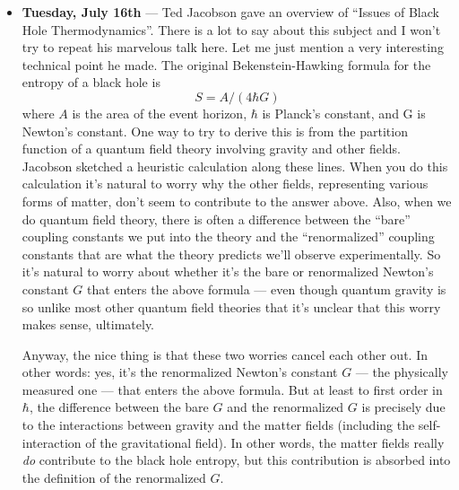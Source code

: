 \documentclass{article}
\begin{document}
\begin{itemize}
\item
  \textbf{Tuesday, July 16th} --- Ted Jacobson gave an overview of
  ``Issues of Black Hole Thermodynamics''. There is a lot to say about
  this subject and I won't try to repeat his marvelous talk here. Let me
  just mention a very interesting technical point he made. The original
  Bekenstein-Hawking formula for the entropy of a black hole is
  \[S=A/(4\hbar G)\] where \(A\) is the area of the event horizon,
  \(\hbar\) is Planck's constant, and G is Newton's constant. One way to
  try to derive this is from the partition function of a quantum field
  theory involving gravity and other fields. Jacobson sketched a
  heuristic calculation along these lines. When you do this calculation
  it's natural to worry why the other fields, representing various forms
  of matter, don't seem to contribute to the answer above. Also, when we
  do quantum field theory, there is often a difference between the
  ``bare'' coupling constants we put into the theory and the
  ``renormalized'' coupling constants that are what the theory predicts
  we'll observe experimentally. So it's natural to worry about whether
  it's the bare or renormalized Newton's constant \(G\) that enters the
  above formula --- even though quantum gravity is so unlike most other
  quantum field theories that it's unclear that this worry makes sense,
  ultimately.

  Anyway, the nice thing is that these two worries cancel each other
  out. In other words: yes, it's the renormalized Newton's constant
  \(G\) --- the physically measured one --- that enters the above
  formula. But at least to first order in \(\hbar\), the difference
  between the bare \(G\) and the renormalized \(G\) is precisely due to
  the interactions between gravity and the matter fields (including the
  self-interaction of the gravitational field). In other words, the
  matter fields really \emph{do} contribute to the black hole entropy,
  but this contribution is absorbed into the definition of the
  renormalized \(G\).


\end{itemize}
\end{document}
